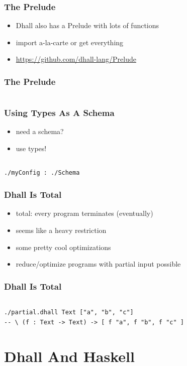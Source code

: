 \documentclass{beamer}
\begin{document}
\begin{frame}
  \frametitle{The Prelude}
  \begin{itemize}
  \item Dhall also has a Prelude with lots of functions
  \item import a-la-carte or get everything
  \item \url{https://github.com/dhall-lang/Prelude}
  \end{itemize}
\end{frame}

\begin{frame}
  \frametitle{The Prelude}
  \inputminted[fontsize=\scriptsize]{text}{dhall/use-prelude.dhall}
\end{frame}

\begin{frame}[fragile]
  \frametitle{Using Types As A Schema}
  \begin{itemize}
  \item need a schema?
  \item use types!
  \end{itemize}
 \inputminted{text}{dhall/schema/Schema}
 \begin{verbatim}
./myConfig : ./Schema
 \end{verbatim}
\end{frame}

\begin{frame}
  \frametitle{Dhall Is Total}
  \begin{itemize}
  \item total: every program terminates (eventually)
  \item seems like a heavy restriction
  \item some pretty cool optimizations
  \item reduce/optimize programs with partial input possible
  \end{itemize}
\end{frame}

\begin{frame}[fragile]
  \frametitle{Dhall Is Total}
  \inputminted[fontsize=\scriptsize]{text}{dhall/partial.dhall}
  \begin{verbatim}
./partial.dhall Text ["a", "b", "c"]
-- \ (f : Text -> Text) -> [ f "a", f "b", f "c" ]
  \end{verbatim}
\end{frame}

\section{Dhall And Haskell}
\end{document}
